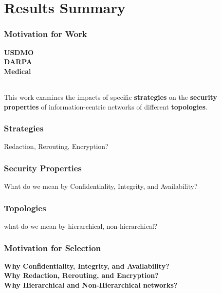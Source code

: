 \documentclass[t,handout]{beamer}
\begin{document}
\section{Results Summary}

\begin{frame}
\frametitle{Motivation for Work}
{\bf USDMO} \\
{\bf DARPA} \\
{\bf Medical}\\
~\\
\begin{center}
This work examines the impacts of specific {\bf strategies} on the {\bf security properties} of information-centric networks of different {\bf topologies}.
\end{center}
\end{frame}

\begin{frame}
\frametitle{Strategies}
Redaction, Rerouting, Encryption?
\end{frame}

\begin{frame}
\frametitle{Security Properties}
What do we mean by Confidentiality, Integrity, and Availability?
\end{frame}

\begin{frame}
\frametitle{Topologies}
what do we mean by hierarchical, non-hierarchical?
\end{frame}

\begin{frame}
\frametitle{Motivation for Selection}
{\bf Why Confidentiality, Integrity, and Availability?} \\
{\bf Why Redaction, Rerouting, and Encryption?} \\
{\bf Why Hierarchical and Non-Hierarchical networks?} \\
\end{frame}
\end{document}
